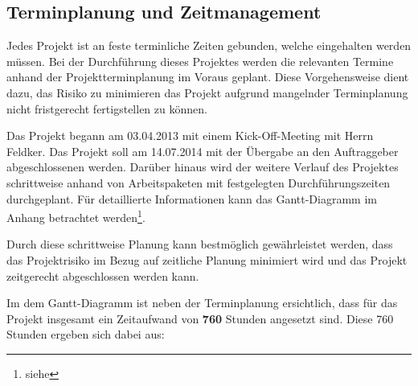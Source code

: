 \subsection{Terminplanung und Zeitmanagement}
\label{sec:TerminplanungUndZeitManagement}

Jedes Projekt ist an feste terminliche Zeiten gebunden, welche eingehalten werden müssen. Bei der Durchführung dieses 
Projektes werden die relevanten Termine anhand der Projektterminplanung im Voraus geplant. Diese Vorgehensweise 
dient dazu, das Risiko zu minimieren das Projekt aufgrund mangelnder Terminplanung nicht fristgerecht fertigstellen zu 
können.

Das Projekt begann am 03.04.2013 mit einem Kick-Off-Meeting mit Herrn Feldker. Das Projekt 
soll am 14.07.2014 mit der Übergabe an den Auftraggeber abgeschlossenen werden. Darüber hinaus wird 
der weitere Verlauf des Projektes schrittweise anhand von 
Arbeitspaketen mit festgelegten Durchführungszeiten durchgeplant. Für detaillierte Informationen kann das Gantt-Diagramm 
im Anhang betrachtet werden\footnote{siehe }.

Durch diese schrittweise Planung kann bestmöglich gewährleistet werden, dass das  Projektrisiko im Bezug auf zeitliche 
Planung minimiert wird und das Projekt zeitgerecht abgeschlossen werden kann.

Im dem Gantt-Diagramm ist neben der Terminplanung ersichtlich, dass für das Projekt insgesamt ein Zeitaufwand von
\textbf{760} Stunden angesetzt sind. Diese 760 Stunden ergeben sich dabei aus:

